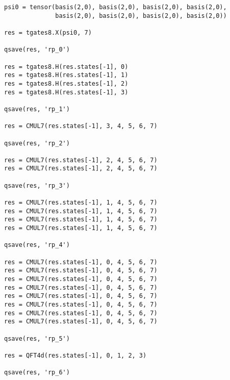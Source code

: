 \begin{verbatim}
psi0 = tensor(basis(2,0), basis(2,0), basis(2,0), basis(2,0),
              basis(2,0), basis(2,0), basis(2,0), basis(2,0))

res = tgates8.X(psi0, 7)

qsave(res, 'rp_0')

res = tgates8.H(res.states[-1], 0)
res = tgates8.H(res.states[-1], 1)
res = tgates8.H(res.states[-1], 2)
res = tgates8.H(res.states[-1], 3)

qsave(res, 'rp_1')

res = CMUL7(res.states[-1], 3, 4, 5, 6, 7)

qsave(res, 'rp_2')

res = CMUL7(res.states[-1], 2, 4, 5, 6, 7)
res = CMUL7(res.states[-1], 2, 4, 5, 6, 7)

qsave(res, 'rp_3')

res = CMUL7(res.states[-1], 1, 4, 5, 6, 7)
res = CMUL7(res.states[-1], 1, 4, 5, 6, 7)
res = CMUL7(res.states[-1], 1, 4, 5, 6, 7)
res = CMUL7(res.states[-1], 1, 4, 5, 6, 7)

qsave(res, 'rp_4')

res = CMUL7(res.states[-1], 0, 4, 5, 6, 7)
res = CMUL7(res.states[-1], 0, 4, 5, 6, 7)
res = CMUL7(res.states[-1], 0, 4, 5, 6, 7)
res = CMUL7(res.states[-1], 0, 4, 5, 6, 7)
res = CMUL7(res.states[-1], 0, 4, 5, 6, 7)
res = CMUL7(res.states[-1], 0, 4, 5, 6, 7)
res = CMUL7(res.states[-1], 0, 4, 5, 6, 7)
res = CMUL7(res.states[-1], 0, 4, 5, 6, 7)

qsave(res, 'rp_5')

res = QFT4d(res.states[-1], 0, 1, 2, 3)

qsave(res, 'rp_6')

\end{verbatim}

